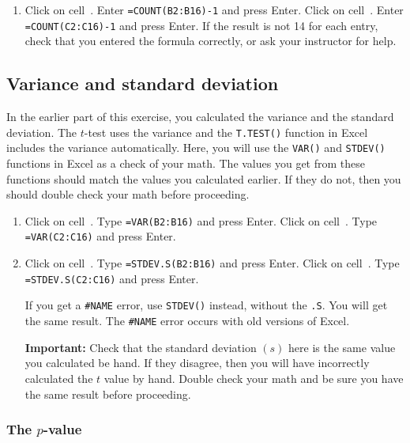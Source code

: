 \documentclass[12pt]{exam}
\newcommand*\xcell[1]{cell~\liningnum{#1}}
\begin{document}
\begin{enumerate}[resume]

	\item \label{df_calc} Click on \xcell{B18}. Enter \texttt{=COUNT(B2:B16)-1} and press Enter. Click on \xcell{C18}. Enter \texttt{=COUNT(C2:C16)-1} and press Enter. If the result is not 14 for each entry, check that you entered the formula correctly, or ask your instructor for help.
	
\end{enumerate}

\subsection*{Variance and standard deviation}

In the earlier part of this exercise, you calculated the variance and the standard deviation. The $t$-test uses the variance and the \texttt{T.TEST()} function in Excel includes the variance automatically. Here, you will use the \texttt{VAR()} and \texttt{STDEV()} functions in Excel as a check of your math. The values you get from these functions should match the values you calculated earlier.  If they do not, then you should double check your math before proceeding.

\begin{enumerate}[resume]

	\item Click on \xcell{B19}. Type \texttt{=VAR(B2:B16)} and press Enter. Click on \xcell{C19}. Type \texttt{=VAR(C2:C16)} and press Enter. 

	\item Click on \xcell{B20}. Type \texttt{=STDEV.S(B2:B16)} and press Enter. Click on \xcell{C20}. Type \texttt{=STDEV.S(C2:C16)} and press Enter. 
	
		If you get a \texttt{\#NAME} error, use \texttt{STDEV()} instead, without the \texttt{.S}. You will get the same result. The \texttt{\#NAME} error occurs with old versions of Excel.  
		
		\textbf{Important:} Check that the standard deviation $\left(s\right)$ here is the same value you calculated be hand. If they disagree, then you will have incorrectly calculated the $t$ value by hand. Double check your math and be sure you have the same result before proceeding.
	
\end{enumerate}

\subsubsection*{The $p$-value}
\end{document}
